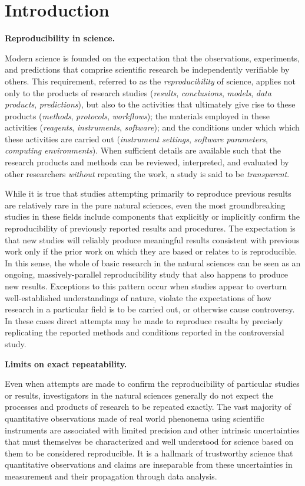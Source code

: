 \section{Introduction}

\textbf{Reproducibility in science.}

Modern science is founded on the expectation that the observations, experiments, and
	predictions that comprise scientific research be independently verifiable by others.
This requirement, referred to as the \emph{reproducibility} of 
	science, applies not only to the products of research studies (\emph{results}, 
	\emph{conclusions}, \emph{models}, \emph{data products}, \emph{predictions}), but also to the 
	activities that ultimately give rise to these products (\emph{methods}, 
	\emph{protocols}, \emph{workflows}); the materials employed in these 
 	activities (\emph{reagents}, \emph{instruments}, \emph{software}); and the conditions 
	under which which these activities are carried out (\emph{instrument settings}, 
	\emph{software parameters},
	\emph{computing environments}).  When sufficient details are available
	such that the research products and methods can be reviewed, interpreted, and
	evaluated by other researchers \emph{without} repeating the work, a study is said to be 
	\emph{transparent}.

While it is true that studies attempting primarily to reproduce previous results are relatively rare in the
	pure natural sciences, even the most groundbreaking studies in these fields include components	
	that explicitly or implicitly confirm the reproducibility of previously reported results and procedures.
The expectation is that new studies will reliably produce meaningful results consistent with previous work 
	only if the prior work on which they are based or relates to is reproducible.
In this sense, the whole of basic research in the natural sciences can be seen as an ongoing, massively-parallel
	reproducibility study that also happens to produce new results.
Exceptions to this pattern occur when studies appear to overturn well-established understandings of nature,
	violate the expectations of how research in a particular field is to be carried out, or otherwise cause controversy.
In these cases direct attempts may be made to reproduce results by precisely replicating the reported methods
	and conditions reported in the controversial study.


\textbf{Limits on exact repeatability.}

Even when attempts are made to confirm the reproducibility of particular studies or results, investigators in
	the natural sciences generally do not expect the processes and products of research to be repeated exactly.
The vast majority of quantitative observations made of real world phenonema using scientific instruments
	are associated with limited precision and other intrinsic uncertainties that must themselves be characterized
	and well understood for science based on them to be considered reproducible.
It is a hallmark of trustworthy science that quantitative observations and claims are inseparable from these 
	uncertainties in measurement and their propagation through data analysis.

